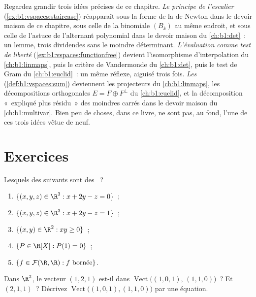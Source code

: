\begin{remark}
\label{rem:b1:vspaces:threads}
Regardez grandir trois idées précises de ce chapitre.
\emph{Le principe de l'escalier}
(\cref{ex:b1:vspaces:staircase}) réapparaît sous la forme de la 
de Newton dans le devoir maison de ce chapitre, sous celle de la 
binomiale $(B_k)$ au même endroit, et sous celle de l'astuce de
l'alternant polynomial dans le devoir maison du \cref{ch:b1:det}~: un
lemme, trois dividendes sans le moindre déterminant.
\emph{L'évaluation comme test de liberté}
(\cref{ex:b1:vspaces:functionfree}) devient l'isomorphisme
d'interpolation du \cref{ch:b1:linmaps}, puis le critère de
Vandermonde du \cref{ch:b1:det}, puis le test de Gram du
\cref{ch:b1:euclid}~: un même réflexe, aiguisé trois fois.
\emph{Les } (\cref{def:b1:vspaces:sum}) deviennent les
projecteurs du \cref{ch:b1:linmaps}, les décompositions orthogonales
$E = F \oplus F^\perp$ du \cref{ch:b1:euclid}, et la décomposition
«~expliqué plus résidu~» des moindres carrés dans le devoir maison du
\cref{ch:b1:multivar}. Bien peu de choses, dans ce livre, ne sont pas,
au fond, l'une de ces trois idées vêtue de neuf.
\end{remark}

\section{Exercices}

\begin{exercise}[$\star$]\label{exo:b1:vspaces:1}
Lesquels des  suivants sont des ~?
\begin{enumerate}
  \item $\{(x, y, z) \in \R^3 : x + 2y - z = 0\}$~;
  \item $\{(x, y, z) \in \R^3 : x + 2y - z = 1\}$~;
  \item $\{(x, y) \in \R^2 : xy \geq 0\}$~;
  \item $\{P \in \R[X] : P(1) = 0\}$~;
  \item $\{f \in \mathcal{F}(\R,\R) : f \text{ bornée}\}$.
\end{enumerate}
\end{exercise}

\begin{exercise}[$\star$]\label{exo:b1:vspaces:2}
Dans $\R^3$, le vecteur $(1, 2, 1)$ est-il dans
$\operatorname{Vect}\bigl((1,0,1),\, (1,1,0)\bigr)$~? Et $(2, 1,
1)$~? Décrivez $\operatorname{Vect}\bigl((1,0,1),(1,1,0)\bigr)$ par
une équation.
\end{exercise}

